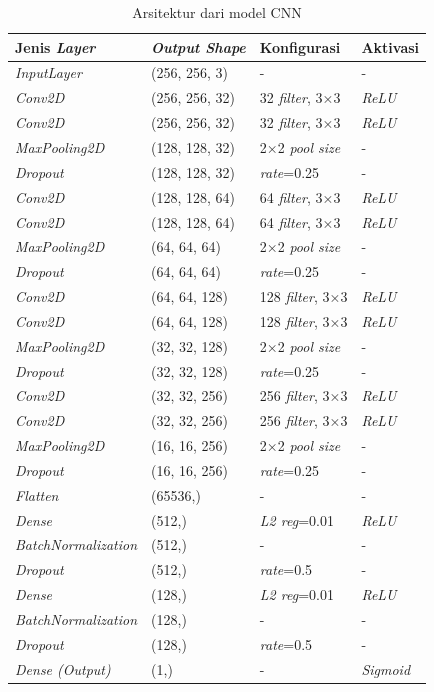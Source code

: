 \begin{table}[H]
\centering
\caption{Arsitektur dari model CNN}
\label{tab:custom_cnn_arch}
\begin{tabular}{|l|l|l|l|}
\hline
\textbf{Jenis \textit{Layer}} & \textbf{\textit{Output Shape}} & \textbf{Konfigurasi} & \textbf{Aktivasi} \\
\hline
\textit{InputLayer} & (256, 256, 3) & - & - \\
\hline
\textit{Conv2D} & (256, 256, 32) & 32 \textit{filter}, 3×3 & \textit{ReLU} \\
\textit{Conv2D} & (256, 256, 32) & 32 \textit{filter}, 3×3 & \textit{ReLU} \\
\textit{MaxPooling2D} & (128, 128, 32) & 2×2 \textit{pool size} & - \\
\textit{Dropout} & (128, 128, 32) & \textit{rate}=0.25 & - \\
\hline
\textit{Conv2D} & (128, 128, 64) & 64 \textit{filter}, 3×3 & \textit{ReLU} \\
\textit{Conv2D} & (128, 128, 64) & 64 \textit{filter}, 3×3 & \textit{ReLU} \\
\textit{MaxPooling2D} & (64, 64, 64) & 2×2 \textit{pool size} & - \\
\textit{Dropout} & (64, 64, 64) & \textit{rate}=0.25 & - \\
\hline
\textit{Conv2D} & (64, 64, 128) & 128 \textit{filter}, 3×3 & \textit{ReLU} \\
\textit{Conv2D} & (64, 64, 128) & 128 \textit{filter}, 3×3 & \textit{ReLU} \\
\textit{MaxPooling2D} & (32, 32, 128) & 2×2 \textit{pool size} & - \\
\textit{Dropout} & (32, 32, 128) & \textit{rate}=0.25 & - \\
\hline
\textit{Conv2D} & (32, 32, 256) & 256 \textit{filter}, 3×3 & \textit{ReLU} \\
\textit{Conv2D} & (32, 32, 256) & 256 \textit{filter}, 3×3 & \textit{ReLU} \\
\textit{MaxPooling2D} & (16, 16, 256) & 2×2 \textit{pool size} & - \\
\textit{Dropout} & (16, 16, 256) & \textit{rate}=0.25 & - \\
\hline
\textit{Flatten} & (65536,) & - & - \\
\textit{Dense} & (512,) & \textit{L2 reg}=0.01 & \textit{ReLU} \\
\textit{BatchNormalization} & (512,) & - & - \\
\textit{Dropout} & (512,) & \textit{rate}=0.5 & - \\
\textit{Dense} & (128,) & \textit{L2 reg}=0.01 & \textit{ReLU} \\
\textit{BatchNormalization} & (128,) & - & - \\
\textit{Dropout} & (128,) & \textit{rate}=0.5 & - \\
\textit{Dense (Output)} & (1,) & - & \textit{Sigmoid} \\
\hline
\end{tabular}
\end{table}

